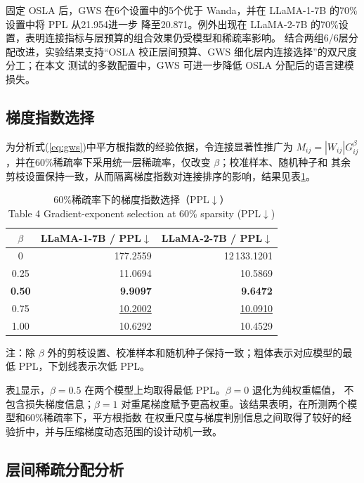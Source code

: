 \documentclass[UTF8,fontset=fandol]{ctexart}
\renewcommand{\arraystretch}{1.08}
\newcommand{\best}[1]{\textbf{#1}}
\newcommand{\second}[1]{\underline{#1}}
\begin{document}
固定 OSLA 后，GWS 在6个设置中的5个优于 Wanda，并在 LLaMA-1-7B 的70\%设置中将 PPL 从21.954进一步
降至20.871。例外出现在 LLaMA-2-7B 的70\%设置，表明连接指标与层预算的组合效果仍受模型和稀疏率影响。
结合两组6/6层分配改进，实验结果支持“OSLA 校正层间预算、GWS 细化层内连接选择”的双尺度分工；在本文
测试的多数配置中，GWS 可进一步降低 OSLA 分配后的语言建模损失。

\FloatBarrier
\subsection{梯度指数选择}

为分析式(\ref{eq:gws})中平方根指数的经验依据，令连接显著性推广为
$M_{ij}=|W_{ij}|G_{ij}^\beta$，并在60\%稀疏率下采用统一层稀疏率，仅改变 $\beta$；校准样本、随机种子和
其余剪枝设置保持一致，从而隔离梯度指数对连接排序的影响，结果见表\ref{tab:gradient_ablation}。

\begin{table}[!htbp]
\centering
\caption{60\%稀疏率下的梯度指数选择（PPL$\downarrow$）\\
Table 4 Gradient-exponent selection at 60\% sparsity (PPL$\downarrow$)}
\label{tab:gradient_ablation}
\scriptsize
\setlength{\tabcolsep}{5.2pt}
\renewcommand{\arraystretch}{0.98}
\begin{tabular}{crr}
\toprule
$\beta$ & LLaMA-1-7B / PPL$\downarrow$ & LLaMA-2-7B / PPL$\downarrow$ \\
\midrule
0    & 177.2559 & 12\,133.1201 \\
0.25 & 11.0694 & 10.5869 \\
\textbf{0.50} & \best{9.9097} & \best{9.6472} \\
0.75 & \second{10.2002} & \second{10.0910} \\
1.00 & 10.6292 & 10.4529 \\
\bottomrule
\end{tabular}
\vspace{2pt}
\parbox{0.82\textwidth}{\scriptsize
注：除 $\beta$ 外的剪枝设置、校准样本和随机种子保持一致；粗体表示对应模型的最低 PPL，下划线表示次低 PPL。}
\end{table}

表\ref{tab:gradient_ablation}显示，$\beta=0.5$ 在两个模型上均取得最低 PPL。$\beta=0$ 退化为纯权重幅值，
不包含损失梯度信息；$\beta=1$ 对重尾梯度赋予更高权重。该结果表明，在所测两个模型和60\%稀疏率下，平方根指数
在权重尺度与梯度判别信息之间取得了较好的经验折中，并与压缩梯度动态范围的设计动机一致。

\subsection{层间稀疏分配分析}
\end{document}
